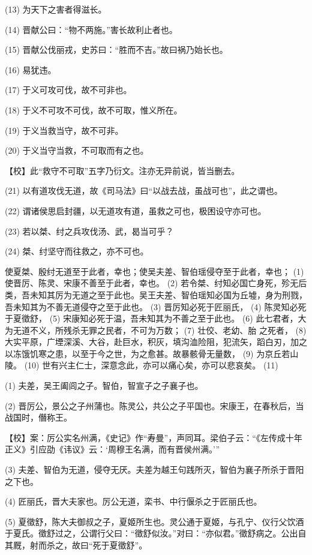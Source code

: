 \documentclass[12pt,UTF8]{ctexbook}
\begin{document}
(13) 为天下之害者得滋长。

(14) 晋献公曰：“物不两施。”害长故利止者也。

(15) 晋献公伐丽戎，史苏曰：“胜而不吉。”故曰祸乃始长也。

(16) 易犹违。

(17) 于义可攻可伐，故不可非也。

(18) 于义不可攻不可伐，故不可取，惟义所在。

(19) 于义当救当守，故不可非。

(20) 于义当守当救，不可取而有之也。

【校】此“救守不可取”五字乃衍文。注亦无异前说，皆当删去。

(21) 以有道攻伐无道，故《司马法》曰“以战去战，虽战可也”，此之谓也。

(22) 谓诸侯思启封疆，以无道攻有道，虽救之可也，极困设守亦可也。

(23) 若以桀、纣之兵攻伐汤、武，曷当可乎？

(24) 桀、纣坚守而往救之，亦不可也。

使夏桀、殷纣无道至于此者，幸也；使吴夫差、智伯瑶侵夺至于此者，幸也； (1) 使晋厉、陈灵、宋康不善至于此者，幸也。 (2) 若令桀、纣知必国亡身死，殄无后类，吾未知其厉为无道之至于此也。吴王夫差、智伯瑶知必国为丘墟，身为刑戮，吾未知其为不善无道侵夺之至于此也。 (3) 晋厉知必死于匠丽氏， (4) 陈灵知必死于夏徵舒， (5) 宋康知必死于温，吾未知其为不善之至于此也。 (6) 此七君者，大为无道不义，所残杀无罪之民者，不可为万数； (7) 壮佼、老幼、胎 之死者， (8) 大实平原，广堙深溪、大谷，赴巨水，积灰，填沟洫险阻，犯流矢，蹈白刃，加之以冻饿饥寒之患，以至于今之世，为之愈甚。故暴骸骨无量数， (9) 为京丘若山陵。 (10) 世有兴主仁士，深意念此，亦可以痛心矣，亦可以悲哀矣。 (11)

(1) 夫差，吴王阖闾之子。智伯，智宣子之子襄子也。

(2) 晋厉公，景公之子州蒲也。陈灵公，共公之子平国也。宋康王，在春秋后，当战国时，僭称王。

【校】案：厉公实名州满，《史记》作“寿曼”，声同耳。梁伯子云：“《左传成十年正义》引应劭《讳议》云：‘周穆王名满，而有晋侯州满。’”

(3) 夫差、智伯为无道，侵夺无厌。夫差为越王句践所灭，智伯为襄子所杀于晋阳之下也。

(4) 匠丽氏，晋大夫家也。厉公无道，栾书、中行偃杀之于匠丽氏也。

(5) 夏徵舒，陈大夫御叔之子，夏姬所生也。灵公通于夏姬，与孔宁、仪行父饮酒于夏氏。徵舒过之，公谓行父曰：“徵舒似汝。”对曰：“亦似君。”徵舒病之。公出自其厩，射而杀之，故曰“死于夏徵舒”。
\end{document}
